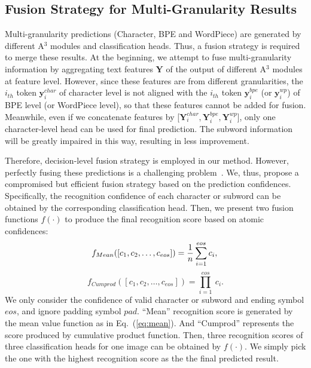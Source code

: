\documentclass[runningheads]{llncs}
\begin{document}
\subsection{Fusion Strategy for Multi-Granularity Results }
\label{sec:fuse}
Multi-granularity predictions (Character, BPE and WordPiece) are generated by different A$^3$ modules and classification heads. Thus, a fusion strategy is required to merge these results. At the beginning, we attempt to fuse multi-granularity information by aggregating text features  $\mathbf{Y}$ of the output of different A$^3$ modules at feature level. However, since these features are from different granularities, the $i_{th}$  token $\mathbf{y}_i^{char}$ of character level is not aligned with the $i_{th}$ token $\mathbf{y}_i^{bpe}$ (or $\mathbf{y}_i^{wp}$) of BPE level (or WordPiece level), so that these features cannot be added for fusion. Meanwhile, even if we concatenate features by [$\mathbf{Y}_i^{char}, \mathbf{Y}_i^{bpe}, \mathbf{Y}_i^{wp}$], only one character-level head can be used for final prediction. The subword information will be greatly impaired in this way, resulting in less improvement.

Therefore, decision-level fusion strategy is employed in our method. However, perfectly fusing these predictions is a challenging problem~\cite{rrlrgu}.
We, thus, propose a compromised but efficient fusion strategy based on the prediction confidences.
Specifically, the recognition confidence of each character or subword can be obtained by the corresponding classification head.
Then, we present two fusion functions $f(\cdot)$ to produce the final recognition score based on atomic confidences:
\begin{equation}
\label{eq:mean}
f_{Mean}([c_1, c_2, \ldots, c_{eos}])= \frac{1}{n} \sum_{i=1}^{eos} c_i, \\
\end{equation}
\begin{equation}
\label{eq:prod}
f_{Cumprod}([c_1, c_2, \ldots, c_{eos}])= \prod_{i=1}^{eos}\ c_i.
\end{equation}
We only consider the confidence of valid character or subword and ending symbol $eos$, and ignore padding symbol $pad$.
``Mean'' recognition score is generated by the mean value function as in Eq.~(\ref{eq:mean}). 
And ``Cumprod'' represents the score produced by cumulative product function.
Then, three recognition scores of three classification heads for one image can be obtained by $f(\cdot)$.
We simply pick the one with the highest recognition score as the the final predicted result.
\end{document}
